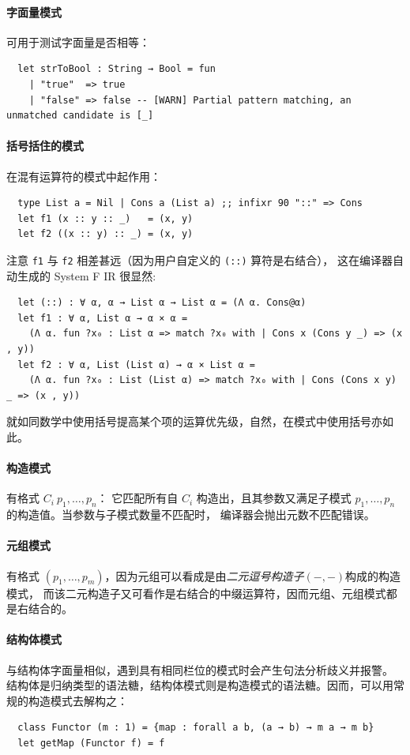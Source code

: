 \documentclass[a4paper, 11pt]{article}
\theoremstyle{remark}\newtheorem*{remark}{Remark}
\theoremstyle{definition}\newtheorem*{definition}{Definition}
\begin{document}
\paragraph*{字面量模式} 可用于测试字面量是否相等：
\begin{verbatim}
  let strToBool : String → Bool = fun
    | "true"  => true
    | "false" => false -- [WARN] Partial pattern matching, an unmatched candidate is [_]
\end{verbatim}
\paragraph*{括号括住的模式} 在混有运算符的模式中起作用：
\begin{verbatim}
  type List a = Nil | Cons a (List a) ;; infixr 90 "::" => Cons
  let f1 (x :: y :: _)   = (x, y)
  let f2 ((x :: y) :: _) = (x, y)
\end{verbatim}
注意 \texttt{f1} 与 \texttt{f2} 相差甚远（因为用户自定义的 \texttt{(::)} 算符是右结合），
这在编译器自动生成的 \Tigris System F IR 很显然:
\begin{verbatim}
  let (::) : ∀ α, α → List α → List α = (Λ α. Cons@α)
  let f1 : ∀ α, List α → α × α =
    (Λ α. fun ?x₀ : List α => match ?x₀ with | Cons x (Cons y _) => (x , y))
  let f2 : ∀ α, List (List α) → α × List α =
    (Λ α. fun ?x₀ : List (List α) => match ?x₀ with | Cons (Cons x y) _ => (x , y))
\end{verbatim}
就如同数学中使用括号提高某个项的运算优先级，自然，在模式中使用括号亦如此。
\paragraph*{构造模式} 有格式 \(C_i\ p_1,\dots,p_n\)：
它匹配所有自 \(C_i\) 构造出，且其参数又满足子模式 \(p_1,\dots,p_n\) 的构造值。当参数与子模式数量不匹配时，
编译器会抛出元数不匹配错误。
\paragraph*{元组模式} 有格式 $(p_1,\dots, p_m)$，因为元组可以看成是由\emph{二元逗号构造子}$(-,-)$构成的构造模式，
而该二元构造子又可看作是右结合的中缀运算符，因而元组、元组模式都是右结合的。
\paragraph*{结构体模式} 与结构体字面量相似，遇到具有相同栏位的模式时会产生句法分析歧义并报警。
结构体是归纳类型的语法糖，结构体模式则是构造模式的语法糖。因而，可以用常规的构造模式去解构之：
\begin{verbatim}
  class Functor (m : 1) = {map : forall a b, (a → b) → m a → m b}
  let getMap (Functor f) = f
\end{verbatim}
\end{document}
